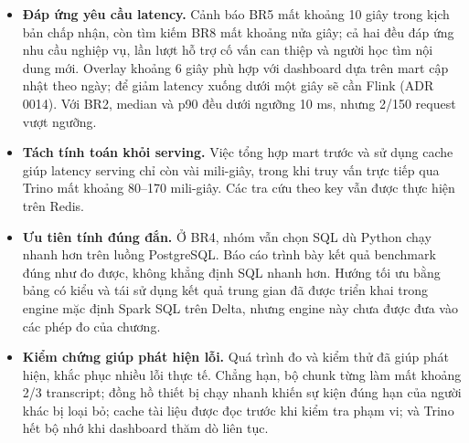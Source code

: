 \begin{itemize}
  \item \textbf{Đáp ứng yêu cầu latency.} Cảnh báo BR5 mất khoảng 10 giây trong kịch bản chấp nhận, còn tìm kiếm BR8 mất khoảng nửa giây; cả hai đều đáp ứng nhu cầu nghiệp vụ, lần lượt hỗ trợ cố vấn can thiệp và người học tìm nội dung mới. Overlay khoảng 6 giây phù hợp với dashboard dựa trên mart cập nhật theo ngày; để giảm latency xuống dưới một giây sẽ cần Flink (ADR 0014). Với BR2, median và p90 đều dưới ngưỡng 10 ms, nhưng 2/150 request vượt ngưỡng.
  \item \textbf{Tách tính toán khỏi serving.} Việc tổng hợp mart trước và sử dụng cache giúp latency serving chỉ còn vài mili-giây, trong khi truy vấn trực tiếp qua Trino mất khoảng 80--170 mili-giây. Các tra cứu theo key vẫn được thực hiện trên Redis.
  \item \textbf{Ưu tiên tính đúng đắn.} Ở BR4, nhóm vẫn chọn SQL dù Python chạy nhanh hơn trên luồng PostgreSQL. Báo cáo trình bày kết quả benchmark đúng như đo được, không khẳng định SQL nhanh hơn. Hướng tối ưu bằng bảng có kiểu và tái sử dụng kết quả trung gian đã được triển khai trong engine mặc định Spark SQL trên Delta, nhưng engine này chưa được đưa vào các phép đo của chương.
  \item \textbf{Kiểm chứng giúp phát hiện lỗi.} Quá trình đo và kiểm thử đã giúp phát hiện, khắc phục nhiều lỗi thực tế. Chẳng hạn, bộ chunk từng làm mất khoảng 2/3 transcript; đồng hồ thiết bị chạy nhanh khiến sự kiện đúng hạn của người khác bị loại bỏ; cache tài liệu được đọc trước khi kiểm tra phạm vi; và Trino hết bộ nhớ khi dashboard thăm dò liên tục.
\end{itemize}
